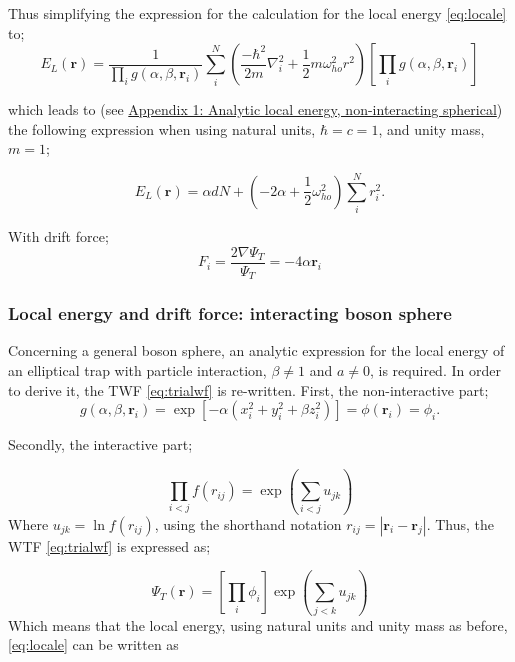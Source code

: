 \documentclass[%
oneside,                 %
final,                   %
10pt]{article}
\begin{document}
Thus simplifying the expression for the calculation for the local energy \eqref{eq:locale} to;
\begin{equation*}
    E_L(\mathbf{r}) =\frac{1}{ 
    \prod_i g(\alpha,\beta,\mathbf{r}_i)
}  \sum_i^N \left(\frac{-\hbar^2}{2m}{\nabla }_{i}^2 +\frac{1}{2}m\omega_{ho}^2r^2 \right)  \left[
    \prod_i g(\alpha,\beta,\mathbf{r}_i)
 \right]
 \end{equation*}

which leads to (see \hyperref[APP_1:le_1]{Appendix 1: Analytic local energy, non-interacting spherical}) the following expression when using natural units, $\hbar = c = 1 $, and unity mass, $m=1$;

\begin{equation}
        E_L(\mathbf{r}) =  \alpha d N + \left( - 2 \alpha    + \frac{1}{2} \omega_{ho}^2\right)  \sum_i^N r_i^2 .
\label{eq:locale_analytic_1}
\end{equation}

With drift force;
\begin{equation}
F_i = \frac{2\nabla \Psi_T}{\Psi_T}= -4\alpha \mathbf{r}_i 
\end{equation}
 
\subsubsection{Local energy and drift force: interacting boson sphere}
Concerning a general boson sphere, an analytic expression for the local energy of an elliptical trap with particle interaction, $\beta\neq 1$ and $a \neq 0$, is required. In order to derive it, the TWF \eqref{eq:trialwf} is re-written. First, the non-interactive part; 
\begin{equation*}
    g(\alpha,\beta,\mathbf{r}_i) = \exp{\left[-\alpha(x_i^2+y_i^2+\beta
    z_i^2)\right]}= \phi(\mathbf{r}_i) = \phi_i.
\end{equation*}

Secondly, the interactive part;

\begin{equation}
\prod_{i<j} f(r_{ij})= \exp{\left(\sum_{i<j}u_{jk}\right)}
\end{equation}
Where $u_{jk}=\ln{f(r_{ij})}$, using the shorthand notation $r_{ij}=|\mathbf{r}_i-\mathbf{r}_j|$. Thus, the WTF \eqref{eq:trialwf} is expressed as;

\begin{equation*}
\Psi_T(\mathbf{r})=\left[
    \prod_i \phi_i
\right]
\exp{\left(\sum_{j<k}u_{jk}\right)}
\end{equation*}
Which means that the local energy, using natural units and unity mass as before, \eqref{eq:locale} can be written as
\end{document}

